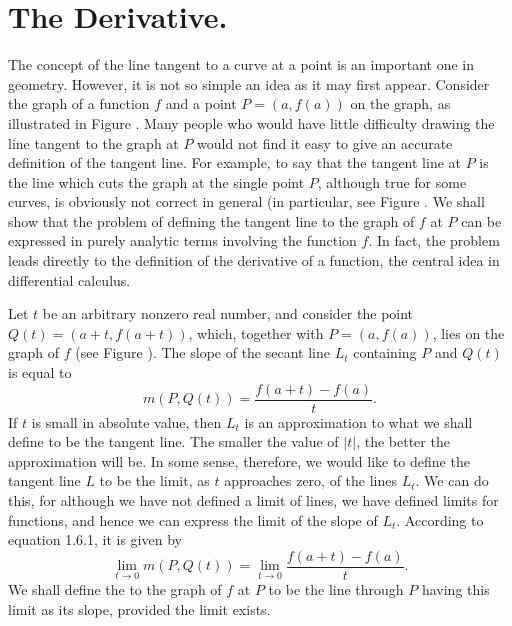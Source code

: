 \section{The Derivative.}\label{sec 1.6}
The concept of the line tangent to a curve at a point
is an important one in geometry.
However, it is not so simple an idea as it may first appear.
Consider the graph of a function $f$
and a point $P = (a, f(a))$ on the graph,
as illustrated in Figure .
Many people who would have little difficulty
drawing the line tangent to the graph at $P$
would not find it easy to give an accurate definition of the tangent line.
For example,
to say that the tangent line at $P$ is the line which cuts the graph
at the single point $P$,
although true for some curves,
is obviously not correct in general
(in particular, see Figure .
We shall show that the problem of
defining the tangent line to the graph of $f$ at $P$
can be expressed in purely analytic terms involving the function $f$.
In fact,
the problem leads directly to the definition of
the derivative of a function,
the central idea in differential calculus.

Let $t$ be an arbitrary nonzero real number,
and consider the point $Q(t) = (a + t, f(a + t))$, which,
together with $P = (a, f(a))$,
lies on the graph of $f$
(see Figure ).
The slope of the secant line $L_t$ containing $P$ and $Q(t)$ is equal to
\begin{equation}
m(P, Q(t)) = \frac{f(a + t) - f(a)}{t} .
\label{eq1.6.1}
\end{equation}
If $t$ is small in absolute value, then $L_t$ is an approximation to what we shall define to be the tangent line.
The smaller the value of $|t|$,
the better the approximation will be.
In some sense, therefore,
we would like to define the tangent line $L$
to be the limit,
as $t$ approaches zero, of the lines $L_t$.
We can do this,
for although we have not defined a limit of lines,
we have defined limits for functions,
and hence we can express the limit of the slope of $L_t$.
According to equation 1.6.1, it is given by
\begin{equation}
\lim_{t \rightarrow 0}{m(P,Q(t))} =
\lim_{t \rightarrow 0}{\frac{f(a + t) - f(a)}{t}} .
\label{eq1.6.2}
\end{equation}
We shall define the  to the graph of $f$ at $P$
to be the line through $P$ having this limit as its slope,
provided the limit exists.

